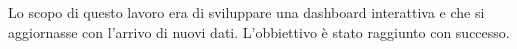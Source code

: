 
\noindent Lo scopo di questo lavoro era di sviluppare una dashboard interattiva e che si aggiornasse con l'arrivo di nuovi dati.
\noindent L'obbiettivo è stato raggiunto con successo.

